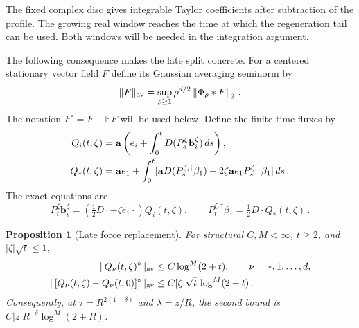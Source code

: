 \documentclass[11pt]{amsart}
\newtheorem{proposition}{Proposition}[section]
\theoremstyle{definition}
\theoremstyle{remark}
\numberwithin{equation}{section}
\newcommand{\E}{\mathbb E}
\renewcommand{\a}{\mathbf a}
\renewcommand{\b}{\mathbf b}
\newcommand{\dd}{\,d}
\newcommand{\norm}[1]{\left\|#1\right\|}
\begin{document}
The fixed complex disc gives integrable Taylor coefficients after subtraction of the profile. The growing real window reaches the time at which the regeneration tail can be used. Both windows will be needed in the integration argument.


The following consequence makes the late split concrete. For a centered stationary vector field $F$ define its Gaussian averaging seminorm by
\begin{equation*}
 \|F\|_{\rm av}
 =\sup_{\rho\geq1}\rho^{d/2}\norm{\Phi_\rho*F}_2\, .
\end{equation*}
The notation $F^\circ=F-\E F$ will be used below. Define the finite-time fluxes by
\begin{align}\label{e:time-flux}
 Q_i(t,\zeta)&=\a\left(e_i+\int_0^tD(P_s^\zeta \b_i^\zeta)\dd s\right),\notag\\
 Q_*(t,\zeta)&=\a e_1+\int_0^t
       [\a D(P_s^{\zeta,\dagger}\beta_1)
           -2\zeta \a e_1P_s^{\zeta,\dagger}\beta_1]\dd s \, .
\end{align}
The exact equations are
\begin{equation*}
 P_t^\zeta \b_i^\zeta=(\tfrac12D\cdot+\zeta e_1\cdot)Q_i(t,\zeta),
 \qquad
 P_t^{\zeta,\dagger}\beta_1=\tfrac12D\cdot Q_*(t,\zeta)\, .
\end{equation*}

\begin{proposition}[Late force replacement]\label{p:late}
For structural $C,M<\infty$, $t\geq2$, and $|\zeta|\sqrt t\leq1$,
\begin{align}\label{e:flux-av}
 \|Q_\nu(t,\zeta)^\circ\|_{\rm av}
 &\leq C\log^M(2+t),\qquad \nu=*,1,\ldots,d,\notag\\
 \|[Q_\nu(t,\zeta)-Q_\nu(t,0)]^\circ\|_{\rm av}
 &\leq C|\zeta|\sqrt t\,\log^M(2+t)\, .
\end{align}
Consequently, at $\tau=R^{2(1-\delta)}$ and $\lambda=z/R$, the second bound is $C|z|R^{-\delta}\log^M(2+R)$.
\end{proposition}
\end{document}
